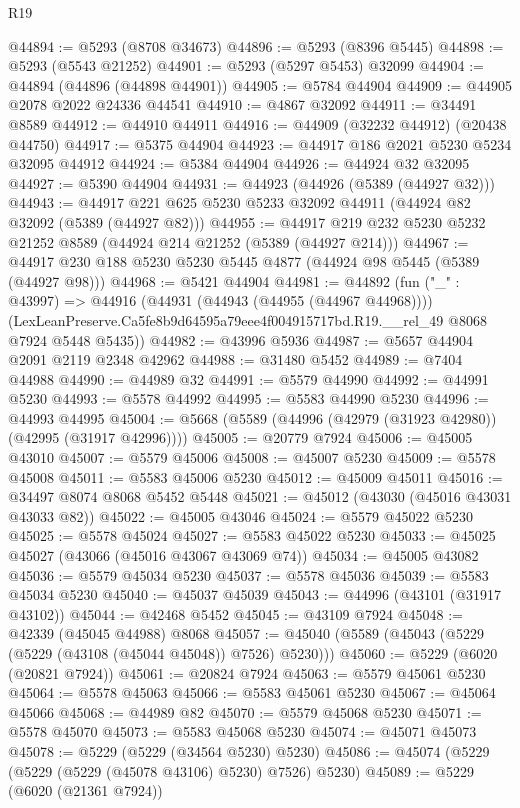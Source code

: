\begin{lexlean}{R19}
\begin{coremodule}
@44894 := @5293 (@8708 @34673)
@44896 := @5293 (@8396 @5445)
@44898 := @5293 (@5543 @21252)
@44901 := @5293 (@5297 @5453) @32099
@44904 := @44894 (@44896 (@44898 @44901))
@44905 := @5784 @44904
@44909 := @44905 @2078 @2022 @24336 @44541
@44910 := @4867 @32092
@44911 := @34491 @8589
@44912 := @44910 @44911
@44916 := @44909 (@32232 @44912) (@20438 @44750)
@44917 := @5375 @44904
@44923 := @44917 @186 @2021 @5230 @5234 @32095 @44912
@44924 := @5384 @44904
@44926 := @44924 @32 @32095
@44927 := @5390 @44904
@44931 := @44923 (@44926 (@5389 (@44927 @32)))
@44943 := @44917 @221 @625 @5230 @5233 @32092 @44911 (@44924 @82 @32092 (@5389 (@44927 @82)))
@44955 := @44917 @219 @232 @5230 @5232 @21252 @8589 (@44924 @214 @21252 (@5389 (@44927 @214)))
@44967 := @44917 @230 @188 @5230 @5230 @5445 @4877 (@44924 @98 @5445 (@5389 (@44927 @98)))
@44968 := @5421 @44904
@44981 := @44892
    (fun ("_" : @43997) =>
    @44916
      (@44931 (@44943 (@44955 (@44967 @44968))))
      (LexLeanPreserve.Ca5fe8b9d64595a79eee4f004915717bd.R19.__rel_49 @8068 @7924 @5448 @5435))
@44982 := @43996 @5936
@44987 := @5657 @44904 @2091 @2119 @2348 @42962
@44988 := @31480 @5452
@44989 := @7404 @44988
@44990 := @44989 @32
@44991 := @5579 @44990
@44992 := @44991 @5230
@44993 := @5578 @44992
@44995 := @5583 @44990 @5230
@44996 := @44993 @44995
@45004 := @5668 (@5589 (@44996 (@42979 (@31923 @42980)) (@42995 (@31917 @42996))))
@45005 := @20779 @7924
@45006 := @45005 @43010
@45007 := @5579 @45006
@45008 := @45007 @5230
@45009 := @5578 @45008
@45011 := @5583 @45006 @5230
@45012 := @45009 @45011
@45016 := @34497 @8074 @8068 @5452 @5448
@45021 := @45012 (@43030 (@45016 @43031 @43033 @82))
@45022 := @45005 @43046
@45024 := @5579 @45022 @5230
@45025 := @5578 @45024
@45027 := @5583 @45022 @5230
@45033 := @45025 @45027 (@43066 (@45016 @43067 @43069 @74))
@45034 := @45005 @43082
@45036 := @5579 @45034 @5230
@45037 := @5578 @45036
@45039 := @5583 @45034 @5230
@45040 := @45037 @45039
@45043 := @44996 (@43101 (@31917 @43102))
@45044 := @42468 @5452
@45045 := @43109 @7924
@45048 := @42339 (@45045 @44988) @8068
@45057 := @45040 (@5589 (@45043 (@5229 (@5229 (@43108 (@45044 @45048)) @7526) @5230)))
@45060 := @5229 (@6020 (@20821 @7924))
@45061 := @20824 @7924
@45063 := @5579 @45061 @5230
@45064 := @5578 @45063
@45066 := @5583 @45061 @5230
@45067 := @45064 @45066
@45068 := @44989 @82
@45070 := @5579 @45068 @5230
@45071 := @5578 @45070
@45073 := @5583 @45068 @5230
@45074 := @45071 @45073
@45078 := @5229 (@5229 (@34564 @5230) @5230)
@45086 := @45074 (@5229 (@5229 (@5229 (@45078 @43106) @5230) @7526) @5230)
@45089 := @5229 (@6020 (@21361 @7924))

\end{coremodule}
\end{lexlean}

